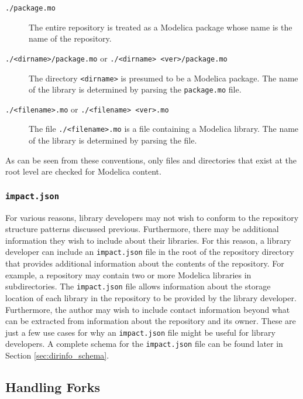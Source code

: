 \documentclass[11pt,a4paper,twocolumn]{article}
\newcommand{\code}[1]{\texttt{#1}} %
\begin{document}
\begin{description}
  \item[\code{./package.mo}] The entire repository is treated as a Modelica
    package whose name is the name of the repository.

  \item[\code{./<dirname>/package.mo} or \code{./<dirname>
      <ver>/package.mo}] The directory \code{<dirname>} is presumed to
    be a Modelica package.  The name of the library is determined by
    parsing the \code{package.mo} file.

  \item[\code{./<filename>.mo} or \code{./<filename> <ver>.mo}] The
    file \code{./<filename>.mo} is a file containing a Modelica
    library.  The name of the library is determined by parsing the
    file.
\end{description}

As can be seen from these conventions, only files and directories that
exist at the root level are checked for Modelica content.

\subsubsection{\code{impact.json}}
\label{sec:dirinfo}

For various reasons, library developers may not wish to conform to the
repository structure patterns discussed previous.  Furthermore, there
may be additional information they wish to include about their
libraries.  For this reason, a library developer can include an
\code{impact.json} file in the root of the repository directory that
provides additional information about the contents of the repository.
For example, a repository may contain two or more Modelica libraries
in subdirectories.  The \code{impact.json} file allows information
about the storage location of each library in the repository to be
provided by the library developer.  Furthermore, the author may wish
to include contact information beyond what can be extracted from
information about the repository and its owner.  These are just a few
use cases for why an \code{impact.json} file might be useful for
library developers.  A complete schema for the \code{impact.json} file
can be found later in Section \ref{sec:dirinfo_schema}.

\subsection{Handling Forks}
\end{document}
